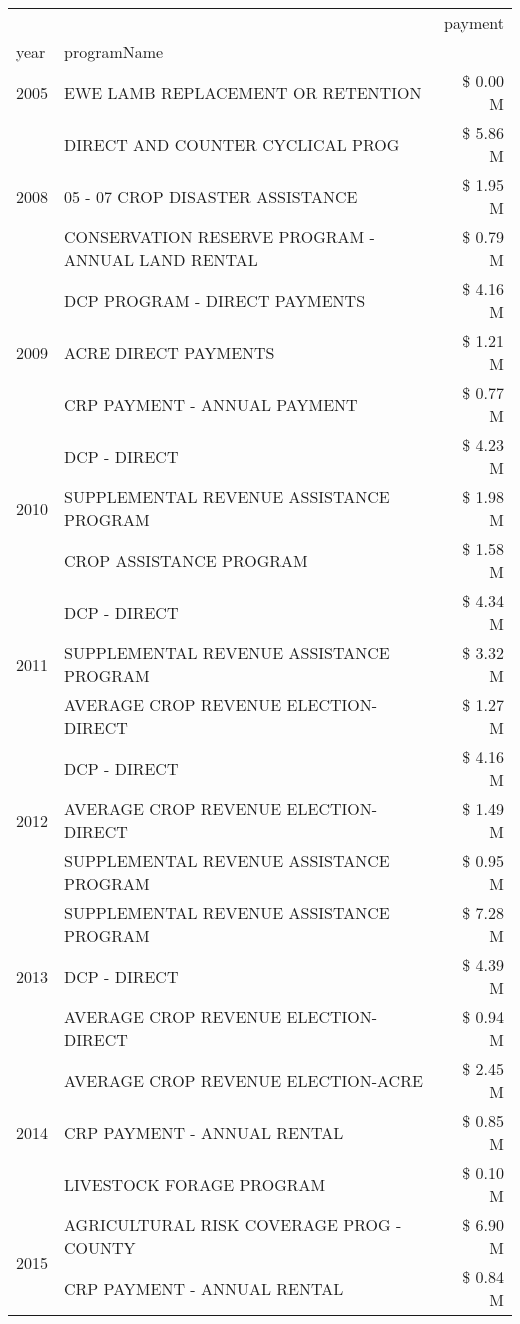 \begin{tabular}{llr}
\toprule
 &  & payment \\
year & programName &  \\
\midrule
2005 & EWE LAMB REPLACEMENT OR RETENTION & \$ 0.00 M \\
\cline{1-3}
\multirow[t]{3}{*}{2008} & DIRECT AND COUNTER CYCLICAL PROG & \$ 5.86 M \\
 & 05 - 07 CROP DISASTER ASSISTANCE & \$ 1.95 M \\
 & CONSERVATION RESERVE PROGRAM - ANNUAL LAND RENTAL & \$ 0.79 M \\
\cline{1-3}
\multirow[t]{3}{*}{2009} & DCP PROGRAM - DIRECT PAYMENTS & \$ 4.16 M \\
 & ACRE DIRECT PAYMENTS & \$ 1.21 M \\
 & CRP PAYMENT - ANNUAL PAYMENT & \$ 0.77 M \\
\cline{1-3}
\multirow[t]{3}{*}{2010} & DCP - DIRECT & \$ 4.23 M \\
 & SUPPLEMENTAL REVENUE ASSISTANCE PROGRAM & \$ 1.98 M \\
 & CROP ASSISTANCE PROGRAM & \$ 1.58 M \\
\cline{1-3}
\multirow[t]{3}{*}{2011} & DCP - DIRECT & \$ 4.34 M \\
 & SUPPLEMENTAL REVENUE ASSISTANCE PROGRAM & \$ 3.32 M \\
 & AVERAGE CROP REVENUE ELECTION-DIRECT & \$ 1.27 M \\
\cline{1-3}
\multirow[t]{3}{*}{2012} & DCP - DIRECT & \$ 4.16 M \\
 & AVERAGE CROP REVENUE ELECTION-DIRECT & \$ 1.49 M \\
 & SUPPLEMENTAL REVENUE ASSISTANCE PROGRAM & \$ 0.95 M \\
\cline{1-3}
\multirow[t]{3}{*}{2013} & SUPPLEMENTAL REVENUE ASSISTANCE PROGRAM & \$ 7.28 M \\
 & DCP - DIRECT & \$ 4.39 M \\
 & AVERAGE CROP REVENUE ELECTION-DIRECT & \$ 0.94 M \\
\cline{1-3}
\multirow[t]{3}{*}{2014} & AVERAGE CROP REVENUE ELECTION-ACRE & \$ 2.45 M \\
 & CRP PAYMENT - ANNUAL RENTAL & \$ 0.85 M \\
 & LIVESTOCK FORAGE PROGRAM & \$ 0.10 M \\
\cline{1-3}
\multirow[t]{3}{*}{2015} & AGRICULTURAL RISK COVERAGE PROG - COUNTY & \$ 6.90 M \\
 & CRP PAYMENT - ANNUAL RENTAL & \$ 0.84 M \\

\end{tabular}
